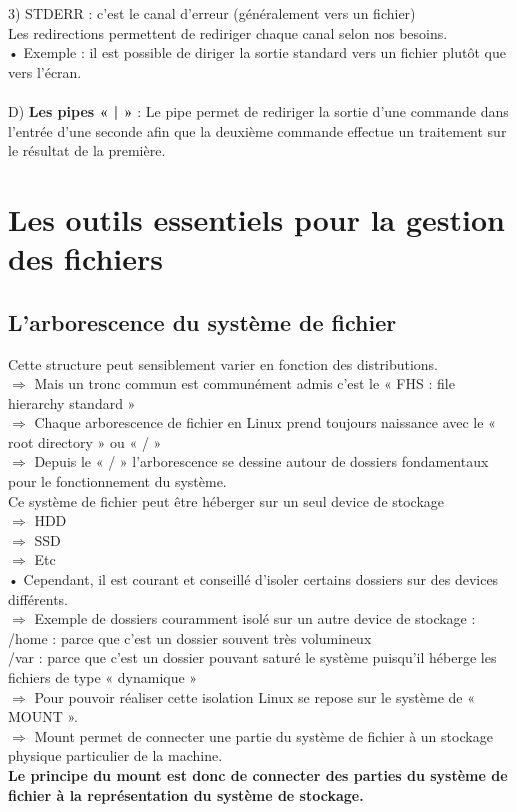 \documentclass[a4paper, 11pt, french, oneside]{book}
\begin{document}
			3) {\color{red}STDERR} : c’est le canal d’erreur (généralement vers un fichier)\\
			
			Les redirections permettent de rediriger chaque canal selon nos besoins.\\
		
		    • Exemple : il est possible de diriger la sortie standard vers un fichier plutôt que vers l’écran.\\\\
			D) \textbf{Les pipes « | »} :
			Le pipe permet de rediriger la sortie d’une commande dans l’entrée d’une seconde afin que la deuxième commande effectue un traitement sur le résultat de la première.
			
	\chapter{Les outils essentiels pour la gestion des fichiers}
		\section{L’arborescence du système de fichier} 
			Cette structure peut sensiblement varier en fonction des distributions.\\
			$\Rightarrow$ Mais un tronc commun est communément admis c’est le « FHS : file hierarchy standard »\\
			$\Rightarrow$ Chaque arborescence de fichier en Linux prend toujours naissance avec le « root directory » ou « / »\\
			$\Rightarrow$ Depuis le « / » l’arborescence se dessine autour de dossiers fondamentaux	pour le fonctionnement du système.\\
			Ce système de fichier peut être héberger sur un seul device de stockage\\
			$\Rightarrow$ HDD\\
			$\Rightarrow$ SSD\\
		    $\Rightarrow$ Etc\\
		    • Cependant, il est courant et conseillé d’isoler certains dossiers sur des devices différents.\\
			$\Rightarrow$ Exemple de dossiers couramment isolé sur un autre device de stockage :\\
		 	/home : parce que c’est un dossier souvent très volumineux\\
		 	/var : parce que c’est un dossier pouvant saturé le système puisqu’il héberge les fichiers de type « dynamique »\\
			$\Rightarrow$ Pour pouvoir réaliser cette isolation Linux se repose sur le système de « MOUNT ».\\
			$\Rightarrow$ Mount permet de connecter une partie du système de fichier à un stockage physique particulier de la machine.\\
			\textbf{Le principe du mount est donc de connecter des parties du système de fichier à la représentation du système de stockage.}
\end{document}
